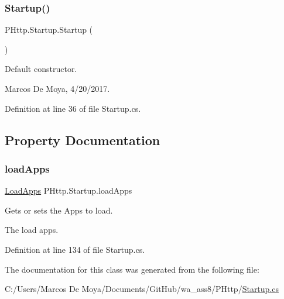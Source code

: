 \subsubsection{\texorpdfstring{Startup()}{Startup()}}
{\footnotesize\ttfamily P\+Http.\+Startup.\+Startup (\begin{DoxyParamCaption}{ }\end{DoxyParamCaption})}



Default constructor. 

Marcos De Moya, 4/20/2017. 

Definition at line 36 of file Startup.\+cs.



\subsection{Property Documentation}
\mbox{\label{class_p_http_1_1_startup_a62c512ed62528faa23f3f504032b5eb5}} 
\subsubsection{\texorpdfstring{load\+Apps}{loadApps}}
{\footnotesize\ttfamily \hyperlink{class_p_http_1_1_load_apps}{Load\+Apps} P\+Http.\+Startup.\+load\+Apps\hspace{0.3cm}{\ttfamily [get]}}



Gets or sets the Apps to load. 

The load apps. 

Definition at line 134 of file Startup.\+cs.



The documentation for this class was generated from the following file\+:\begin{DoxyCompactItemize}
\item 
C\+:/\+Users/\+Marcos De Moya/\+Documents/\+Git\+Hub/wa\+\_\+ass8/\+P\+Http/\hyperlink{_startup_8cs}{Startup.\+cs}\end{DoxyCompactItemize}
